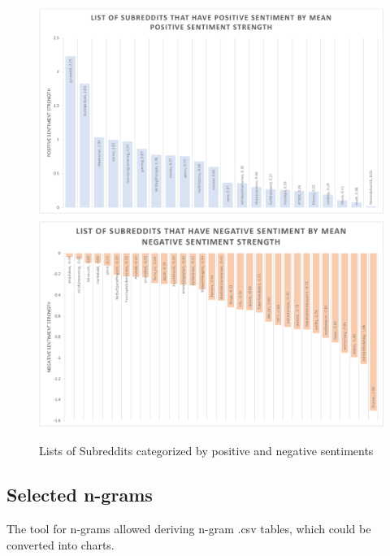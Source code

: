\documentclass[openany]{article}
\begin{document}
\begin{figure}[H]
    \centering
    \includegraphics[width=\textwidth]{positivesentiment.pdf}
    \includegraphics[width=\textwidth]{negativesentiment.pdf}
    \caption{Lists of Subreddits categorized by positive and negative sentiments}
    \label{fig:mesh1}
\end{figure}

\subsection{Selected n-grams}
The tool for n-grams allowed deriving n-gram .csv tables, which could be converted into charts.
\end{document}
